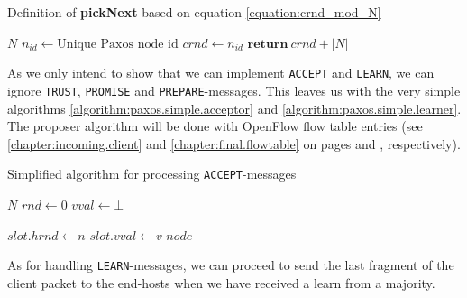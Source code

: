 \begin{algorithm}
  \caption{Definition of \textbf{pickNext} based on equation \ref{equation:crnd_mod_N}}
  \label{algorithm:paxos.simple.pickNext}
  \begin{algorithmic}
    \State $N$ 
    \State $n_{id} \gets \text{Unique Paxos node id}$
    \State $crnd \gets n_{id}$ 
    \State
      \State $\textbf{return}\ crnd + |N|$ 
    \EndFunction
  \end{algorithmic}
\end{algorithm}

As we only intend to show that we can implement \texttt{ACCEPT} and
\texttt{LEARN}, we can ignore \texttt{TRUST}, \texttt{PROMISE} and
\texttt{PREPARE}-messages.  This leaves us with the very simple algorithms
\ref{algorithm:paxos.simple.acceptor} and
\ref{algorithm:paxos.simple.learner}.  The proposer algorithm will be done
with OpenFlow flow table entries (see \ref{chapter:incoming.client}
    and \ref{chapter:final.flowtable} on pages
    \pageref{chapter:final.flowtable} and 
    \pageref{chapter:incoming.client}, respectively).

\begin{algorithm}
  \caption{Simplified algorithm for processing \texttt{ACCEPT}-messages}
  \label{algorithm:paxos.simple.acceptor}
  \begin{algorithmic}
    \State $N$
    \State $rnd \gets 0$ 
    \State $vval \gets \bot$ 
    \State

        \State $slot.hrnd\gets n$
        \State $slot.vval\gets v$ 
           \State {}
                         {$node$}
        \EndForIn
      \EndIf
    \EndOn
  \end{algorithmic}
\end{algorithm}

As for handling \texttt{LEARN}-messages, we can proceed to send the last
fragment of the client packet to the end-hosts when we have received a
learn from a majority.


